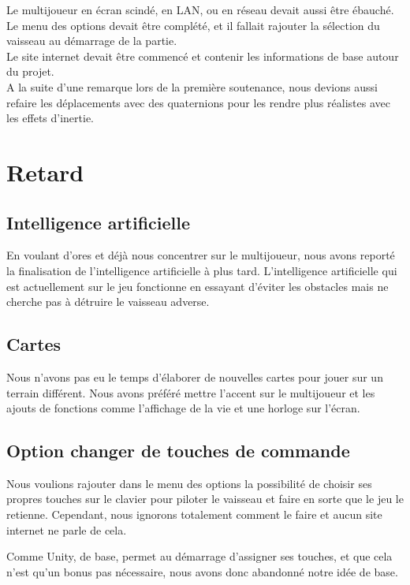 \documentclass[10pt, titlepage]{report}
\begin{document}
 Le multijoueur en écran scindé, en LAN, ou en réseau devait aussi être ébauché. Le menu des options devait être complété, et il fallait rajouter la sélection du vaisseau au démarrage de la partie.\\

Le site internet devait être commencé et contenir les informations de base autour du projet.\\

A la suite d'une remarque lors de la première soutenance, nous devions aussi refaire les déplacements avec des quaternions pour les rendre plus réalistes avec les effets d'inertie.\\

\section{Retard}

\subsection{Intelligence artificielle}
En voulant d'ores et déjà nous concentrer sur le multijoueur, nous avons reporté la finalisation de l'intelligence artificielle à plus tard. L'intelligence artificielle qui est actuellement sur le jeu fonctionne en essayant d'éviter les obstacles mais ne cherche pas à détruire le vaisseau adverse.\\

\subsection{Cartes}
Nous n'avons pas eu le temps d'élaborer de nouvelles cartes pour jouer sur un terrain différent. Nous avons préféré mettre l'accent sur le multijoueur et les ajouts de fonctions comme l'affichage de la vie et une horloge sur l'écran.\\

\subsection{Option changer de touches de commande}

Nous voulions rajouter dans le menu des options la possibilité de choisir ses propres touches sur le clavier pour piloter le vaisseau et faire en sorte que le jeu le retienne. Cependant, nous ignorons totalement comment le faire et aucun site internet ne parle de cela.

Comme Unity, de base, permet au démarrage d'assigner ses touches, et que cela n'est qu'un bonus pas nécessaire, nous avons donc abandonné notre idée de base.\\
\end{document}
